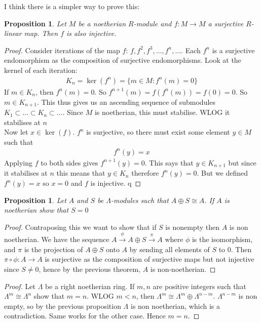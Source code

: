 \documentclass[12pt]{book}
\newtheorem{proposition}[theorem]{Proposition}
\theoremstyle{definition}
\begin{document}
I think there is a simpler way to prove this:
\begin{proposition}
    Let $M$ be a noetherian $R$-module and $f: M \to M$ a surjective $R$-linear map. Then $f$ is also injective.
\end{proposition}
\begin{proof}
    Consider iterations of the map $f$: $f, f^2, f^3, \dots, f^n, \dots$. Each $f^n$ is a surjective endomorphism as the composition of surjective endomorphisms. Look at the kernel of each iteration: 
    \begin{align*}
        K_n = \ker (f^n) = \{m \in  M: f^n(m) = 0\}
    \end{align*}
    If $m \in K_n$, then $f^n(m) = 0$. So $f^{n+1}(m) = f(f^n(m)) = f(0) = 0$. So $m \in K_{n+1}$. This thus gives us an ascending sequence of submodules $K_1 \subset \dots \subset K_n \subset \dots$. Since $M$ is noetherian, this must stabilise. WLOG it stabilises at $n$\\
    Now let $x \in \ker(f)$. $f^n$ is surjective, so there must exist some element $y \in M$ such that 
    \begin{align*}
        f^n(y) = x
    \end{align*}
    Applying $f$ to both sides gives $f^{n+1}(y) = 0$. This says that $y \in K_{n+1}$ but since it stabilises at $n$ this means that $y \in K_n$ therefore $f^n(y) = 0$. But we defined $f^n(y) = x$ so $x = 0$ and $f$ is injective.  q
\end{proof}
\begin{proposition}
    Let $A$ and $S$ be $\Lambda$-modules such that $A \oplus S \cong A$. If $A$ is noetherian show that $S = 0$
\end{proposition}
\begin{proof}
    Contraposing this we want to show that if $S$ is nonempty then $A$ is non noetherian. We have the sequence $A \xrightarrow{\phi} A \oplus S \xrightarrow{\pi} A$ where $\phi$ is the isomorphism, and $\pi$ is the projection of $A \oplus S$ onto $A$ by sending all elements of $S$ to 0. Then $\pi \circ \phi : A \to A$ is surjective as the composition of surjective maps but not injective since $S \neq 0$, hence by the previous theorem, $A$ is non-noetherian. 
\end{proof}

\begin{proof}
    Let $\Lambda$ be a right noetherian ring. If $m,n$ are positive integers such that $\Lambda^m \cong \Lambda^n$ show that $m = n$.
    WLOG $m < n$, then $\Lambda^m \cong \Lambda^m \oplus \Lambda^{n-m}$. $\Lambda^{n-m}$ is non empty, so by the previous proposition $\Lambda$ is non noetherian, which is a contradiction. Same works for the other case. Hence $m = n$. 
\end{proof}
\end{document}
